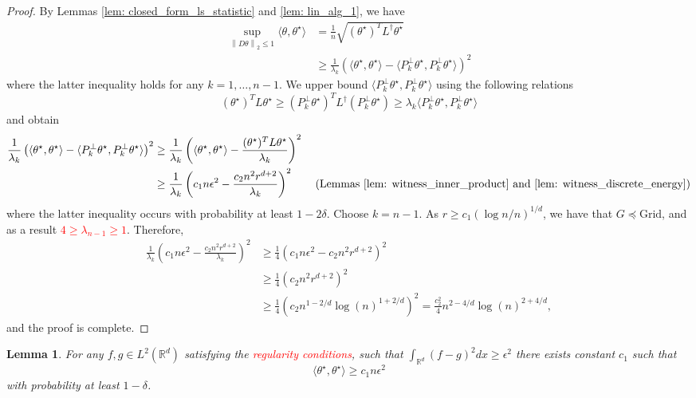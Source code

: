 \documentclass{article}
\newcommand{\Reals}{\mathbb{R}}
\newcommand{\norm}[1]{\left\lVert#1\right\rVert}
\newcommand{\dotp}[2]{\langle #1, #2 \rangle}
\newcommand{\1}{\mathbb{I}}
\newcommand{\Linv}{L^{\dagger}}
\newcommand{\Rd}{\Reals^d}
\newcommand{\thetast}{\theta^{\star}}
\theoremstyle{alden}
\theoremstyle{aldenthm}
\newtheorem{lemma}{Lemma}
\theoremstyle{definition}
\theoremstyle{remark}
\begin{document}
\begin{proof}
	By Lemmas \ref{lem: closed_form_ls_statistic} and \ref{lem: lin_alg_1}, we have
	\begin{align}
	\label{eqn: approx_error_1}
	\sup_{\norm{D\theta}_2 \leq 1} \dotp{\theta}{\thetast} & = \frac{1}{n} \sqrt{(\thetast)^T \Linv \thetast} \nonumber \\
	& \geq \frac{1}{\lambda_k}\left(\dotp{\thetast}{\thetast} - \dotp{P_k^{\perp} \thetast}{P_k^{\perp}\thetast}\right)^2 
	\end{align}
	where the latter inequality holds for any $k = 1, \ldots, n - 1$. We upper bound $\dotp{P_k^{\perp} \thetast}{P_k^{\perp}\thetast}$ using the following relations
	\begin{equation*}
	(\thetast)^T L \thetast \geq (P_k^{\perp}\thetast)^T \Linv ( P_k^{\perp}\thetast) \geq \lambda_k \dotp{P_k^{\perp} \thetast}{P_k^{\perp} \thetast}
	\end{equation*}
	and obtain
	\begin{align*}
	\frac{1}{\lambda_k}\left(\dotp{\thetast}{\thetast} - \dotp{P_k^{\perp} \thetast}{P_k^{\perp}\thetast}\right)^2  & \geq \frac{1}{\lambda_k}\left(\dotp{\thetast}{\thetast} - \frac{(\thetast)^T L \thetast}{\lambda_k} \right)^2 \\
	& \geq \frac{1}{\lambda_k}\left(c_1 n \epsilon^2 - \frac{c_2 n^2 r^{d + 2}}{\lambda_k} \right)^2 \tag{Lemmas \ref{lem: witness_inner_product} and \ref{lem: witness_discrete_energy}}
	\end{align*}
	where the latter inequality occurs with probability at least $1 - 2\delta$. Choose $k = n - 1$. As $r \geq c_1 (\log n / n)^{1/d}$, we have that $G \preceq \mathrm{Grid}$, and as a result \textcolor{red}{$4 \geq \lambda_{n - 1} \geq 1$}. Therefore,
	\begin{align*}
	\frac{1}{\lambda_k}\left(c_1 n \epsilon^2 - \frac{c_2 n^2 r^{d + 2}}{\lambda_k} \right)^2 & \geq \frac{1}{4} \left(c_1 n \epsilon^2 - c_2 n^2 r^{d + 2} \right)^2 \\
	& \geq \frac{1}{4} \left(c_2 n^2 r^{d + 2}\right)^2 \\
	& \geq \frac{1}{4} \left(c_2 n^{1 - 2/d} \log(n)^{1 + 2/d}\right)^2 = \frac{c_2^2}{4} n^{2 - 4/d} \log(n)^{2 + 4/d},
	\end{align*}
	and the proof is complete.
\end{proof}

\begin{lemma}
	\label{lem: witness_inner_product}
	For any $f, g \in L^2(\Rd)$ satisfying the \textcolor{red}{regularity conditions}, such that $\int_{\Rd} (f - g)^2 dx \geq \epsilon^2$ there exists constant $c_1$ such that 
	\begin{equation*}
	\dotp{\thetast}{\thetast} \geq c_1 n \epsilon^2
	\end{equation*}
	with probability at least $1 - \delta$.
\end{lemma}
\end{document}

